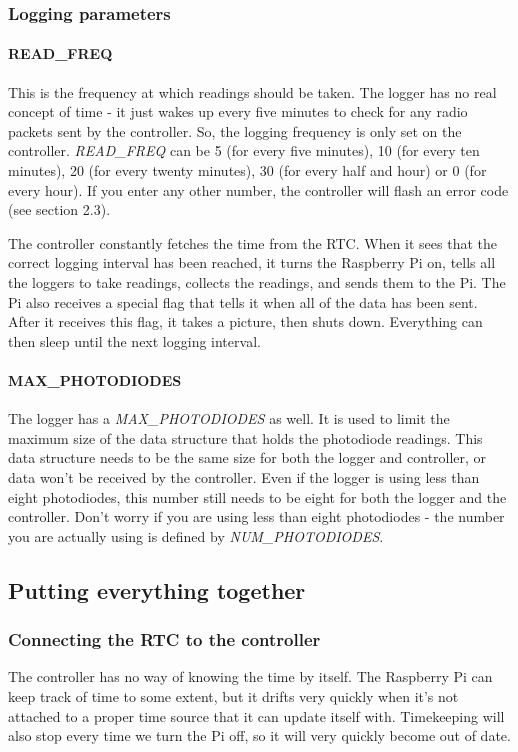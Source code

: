 \documentclass[10pt]{article}
\begin{document}
\subsubsection{Logging parameters}

\paragraph{READ\_FREQ}
This is the frequency at which readings should be taken. The logger has no real concept of time - it just wakes up every five minutes to check for any radio packets sent by the controller. So, the logging frequency is only set on the controller. \textit{READ\_FREQ} can be 5 (for every five minutes), 10 (for every ten minutes), 20 (for every twenty minutes), 30 (for every half and hour) or 0 (for every hour). If you enter any other number, the controller will flash an error code (see section 2.3).

The controller constantly fetches the time from the RTC. When it sees that the correct logging interval has been reached, it turns the Raspberry Pi on, tells all the loggers to take readings, collects the readings, and sends them to the Pi. The Pi also receives a special flag that tells it when all of the data has been sent. After it receives this flag, it takes a picture, then shuts down. Everything can then sleep until the next logging interval.

\paragraph{MAX\_PHOTODIODES}
The logger has a \textit{MAX\_PHOTODIODES} as well. It is used to limit the maximum size of the data structure that holds the photodiode readings. This data structure needs to be the same size for both the logger and controller, or data won't be received by the controller. Even if the logger is using less than eight photodiodes, this number still needs to be eight for both the logger and the controller. Don't worry if you are using less than eight photodiodes - the number you are actually using is defined by \textit{NUM\_PHOTODIODES}.

\subsection{Putting everything together}

\subsubsection{Connecting the RTC to the controller}
The controller has no way of knowing the time by itself. The Raspberry Pi can keep track of time to some extent, but it drifts very quickly when it's not attached to a proper time source that it can update itself with. Timekeeping will also stop every time we turn the Pi off, so it will very quickly become out of date.
\end{document}

